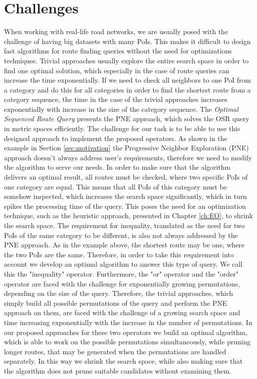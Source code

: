 \section{Challenges}
When working with real-life road networks, we are usually posed with the challenge of having big datasets with many PoIs. This makes it difficult to design fast algorithms for route finding queries without the need for optimizations techniques. Trivial approaches usually explore the entire search space in order to find one optimal solution, which especially in the case of route queries can increase the time exponentially. If we need to check all neighbors to one PoI from a category and do this for all categories in order to find the shortest route from a category sequence, the time in the case of the trivial approaches increases exponentially with increase in the size of the category sequence. The \textit{Optimal Sequenced Route Query} \cite{OSR} presents the PNE approach, which solves the OSR query in metric spaces efficiently. The challenge for our task is to be able to use this designed approach to implement the proposed operators. \newline
As shown in the example in Section \ref{sec:motivation} the Progressive Neighbor Exploration (PNE) approach doesn't always address user's requirements, therefore we need to modify the algorithm to serve our needs. In order to make sure that the algorithm delivers an optimal result, all routes must be checked, where two specific PoIs of one category are equal. This means that all PoIs of this category must be somehow inspected, which increases the search space significantly, which in turn spikes the processing time of the query. This poses the need for an optimization technique, such as the heuristic approach, presented in Chapter \ref{ch:EO}, to shrink the search space. \newline
The requirement for inequality, translated as the need for two PoIs of the same category to be different, is also not always addressed by the PNE approach. As in the example above, the shortest route may be one, where the two PoIs are the same. Therefore, in order to take this requirement into account we develop an optimal algorithm to answer this type of query. We call this the "inequality" operator. \newline
Furthermore, the "or" operator and the "order" operator are faced with the challenge for exponentially growing permutations, depending on the size of the query. Therefore, the trivial approaches, which simply build all possible permutations of the query and perform the PNE approach on them, are faced with the challenge of a growing search space and time increasing exponentially with the increase in the number of permutations. In our proposed approaches for these two operators we build an optimal algorithm, which is able to work on the possible permutations simultaneously, while pruning longer routes, that may be generated when the permutations are handled separately. In this way we shrink the search space, while also making sure that the algorithm does not prune suitable candidates without examining them.

